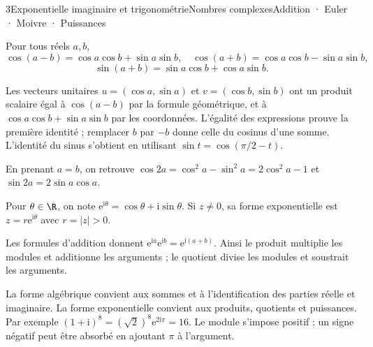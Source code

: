 \begin{ouverture}[trigo]{3}{Exponentielle imaginaire et trigonométrie}{Nombres complexes}{Addition · Euler · Moivre · Puissances}
\end{ouverture}
\essentiel

Pour tous réels $a,b$,
\[\cos(a-b)=\cos a\cos b+\sin a\sin b,\quad
\cos(a+b)=\cos a\cos b-\sin a\sin b,\]
\[\sin(a+b)=\sin a\cos b+\cos a\sin b.\]
\begin{demonstration}
Les vecteurs unitaires $u=(\cos a,\sin a)$ et $v=(\cos b,\sin b)$ ont un produit scalaire égal à $\cos(a-b)$ par la formule géométrique, et à $\cos a\cos b+\sin a\sin b$ par les coordonnées. L'égalité des expressions prouve la première identité ; remplacer $b$ par $-b$ donne celle du cosinus d'une somme. L'identité du sinus s'obtient en utilisant $\sin t=\cos(\pi/2-t)$.
\end{demonstration}
En prenant $a=b$, on retrouve $\cos2a=\cos^2a-\sin^2a=2\cos^2a-1$ et $\sin2a=2\sin a\cos a$.
\begin{definition}
Pour $\theta\in\R$, on note $\mathrm e^{\mathrm i\theta}=\cos\theta+\mathrm i\sin\theta$.
Si $z\ne0$, sa forme exponentielle est $z=r\mathrm e^{\mathrm i\theta}$ avec $r=|z|>0$.
\end{definition}
Les formules d'addition donnent
$\mathrm e^{\mathrm ia}\mathrm e^{\mathrm ib}=\mathrm e^{\mathrm i(a+b)}$.
Ainsi le produit multiplie les modules et additionne les arguments ; le quotient divise les modules et soustrait les arguments.
\begin{savoirfaire}
La forme algébrique convient aux sommes et à l'identification des parties réelle et imaginaire. La forme exponentielle convient aux produits, quotients et puissances.
Par exemple $(1+\mathrm i)^8=(\sqrt2)^8\mathrm e^{2\mathrm i\pi}=16$.
Le module s'impose positif ; un signe négatif peut être absorbé en ajoutant $\pi$ à l'argument.
\end{savoirfaire}
